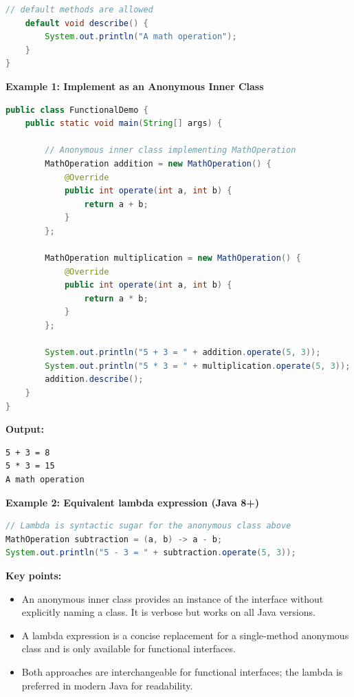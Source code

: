 \documentclass[12pt,a3paper]{article}
\begin{document}
\begin{enumerate}
\begin{tcolorbox}
\begin{lstlisting}[language=Java]
    // default methods are allowed
    default void describe() {
        System.out.println("A math operation");
    }
}
\end{lstlisting}

\medskip
\textbf{Example 1: Implement as an Anonymous Inner
Class}

\begin{lstlisting}[language=Java]
public class FunctionalDemo {
    public static void main(String[] args) {

        // Anonymous inner class implementing MathOperation
        MathOperation addition = new MathOperation() {
            @Override
            public int operate(int a, int b) {
                return a + b;
            }
        };

        MathOperation multiplication = new MathOperation() {
            @Override
            public int operate(int a, int b) {
                return a * b;
            }
        };

        System.out.println("5 + 3 = " + addition.operate(5, 3));
        System.out.println("5 * 3 = " + multiplication.operate(5, 3));
        addition.describe();
    }
}
\end{lstlisting}

\textbf{Output:}
\begin{verbatim}
5 + 3 = 8
5 * 3 = 15
A math operation
\end{verbatim}

\medskip
\textbf{Example 2: Equivalent lambda expression
(Java 8+)}

\begin{lstlisting}[language=Java]
// Lambda is syntactic sugar for the anonymous class above
MathOperation subtraction = (a, b) -> a - b;
System.out.println("5 - 3 = " + subtraction.operate(5, 3));
\end{lstlisting}

\medskip
\textbf{Key points:}
\begin{itemize}[itemsep=2pt]
  \item An anonymous inner class provides an
  instance of the interface without explicitly
  naming a class. It is verbose but works on all
  Java versions.
  \item A lambda expression is a concise replacement
  for a single-method anonymous class and is only
  available for functional interfaces.
  \item Both approaches are interchangeable for
  functional interfaces; the lambda is preferred
  in modern Java for readability.
\end{itemize}


\end{tcolorbox}
\end{enumerate}
\end{document}

